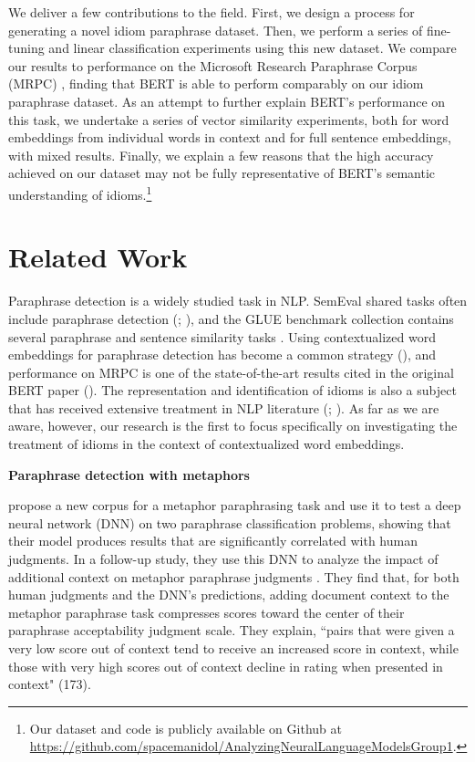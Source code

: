 \documentclass[11pt,a4paper]{article}
\begin{document}
We deliver a few contributions to the field. First, we design a process for generating a novel idiom paraphrase dataset. Then, we perform a series of fine-tuning and linear classification experiments using this new dataset. We compare our results to performance on the Microsoft Research Paraphrase Corpus (MRPC) \cite{dolan-brockett-2005-automatically}, finding that BERT is able to perform comparably on our idiom paraphrase dataset. As an attempt to further explain BERT's performance on this task, we undertake a series of vector similarity experiments, both for word embeddings from individual words in context and for full sentence embeddings, with mixed results. Finally, we explain a few reasons that the high accuracy achieved on our dataset may not be fully representative of BERT's semantic understanding of idioms.\footnote{Our dataset and code is publicly available on Github at \href{https://github.com/spacemanidol/AnalyzingNeuralLanguageModelsGroup1}{https://github.com/spacemanidol/AnalyzingNeuralLanguageModelsGroup1}.}



\section{Related Work}
Paraphrase detection is a widely studied task in NLP. SemEval shared tasks often include paraphrase detection (\citet{Xu2015SemEval2015T1}; \citet{galbraith-etal-2017-talla}), and the GLUE benchmark collection contains several paraphrase and sentence similarity tasks \cite{wang2018glue}. Using contextualized word embeddings for paraphrase detection has become a common strategy (\citet{arase2019transfer}), and performance on MRPC is one of the state-of-the-art results cited in the original BERT paper (\citet{devlin2018bert}).
The representation and identification of idioms is also a subject that has received extensive treatment in NLP literature (\citet{Verma2015ANA}; \citet{liu-hwa-2018-heuristically}). As far as we are aware, however, our research is the first to focus specifically on investigating the treatment of idioms in the context of contextualized word embeddings.

\vspace{2mm}
\noindent\textbf{Paraphrase detection with metaphors} 

\noindent\citet{bizzoni-lappin-2018-predicting} propose a new corpus for a metaphor paraphrasing task and use it to test a deep neural network (DNN) on two paraphrase classification problems, showing that their model produces results that are significantly correlated with human judgments. In a follow-up study, they use this DNN to analyze the impact of additional context on metaphor paraphrase judgments \citep{bizzoni-lappin-2019-effect}. They find that, for both human judgments and the DNN's predictions, adding document context to the metaphor paraphrase task compresses scores toward the center of their paraphrase acceptability judgment scale. They explain, ``pairs that were given a very low score out of context tend to receive an increased score in context, while those with very high scores out of context decline in rating when presented in context" (173). 
\end{document}
